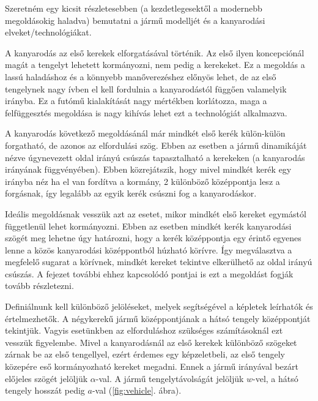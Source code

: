 
Szeretném egy kicsit részletesebben (a kezdetlegesektől a modernebb megoldásokig haladva) bemutatni a jármű modelljét és a kanyarodási elveket/technológiákat.

A kanyarodás az első kerekek elforgatásával történik. Az első ilyen koncepciónál magát a tengelyt lehetett kormányozni, nem pedig a kerekeket. Ez a megoldás a lassú haladáshoz és a könnyebb manőverezéshez előnyös lehet, de az első tengelynek nagy ívben el kell fordulnia a kanyarodástól függően valamelyik irányba. Ez a futómű kialakítását nagy mértékben korlátozza, maga a felfüggesztés megoldása is nagy kihívás lehet ezt a technológiát alkalmazva.

A kanyarodás következő megoldásánál már mindkét első kerék külön-külön forgatható, de azonos az elfordulási szög. Ebben az esetben a jármű dinamikáját nézve úgynevezett oldal irányú csúszás tapasztalható a kerekeken (a kanyarodás irányának függvényében). Ebben közrejátszik, hogy mivel mindkét kerék egy irányba néz ha el van fordítva a kormány, 2 különböző középpontja lesz a forgásnak, így legalább az egyik kerék csúszni fog a kanyarodáskor.

Ideális megoldásnak vesszük azt az esetet, mikor mindkét első kereket egymástól függetlenül lehet kormányozni. Ebben az esetben mindkét kerék kanyarodási szögét meg lehetne úgy határozni, hogy a kerék középpontja egy érintő egyenes lenne a közös kanyarodási középpontból húzható körívre. Így megválasztva a megfelelő sugarat a körívnek, mindkét kereket tekintve elkerülhető az oldal irányú csúszás. A fejezet további ehhez kapcsolódó pontjai is ezt a megoldást fogják tovább részletezni.

Definiálnunk kell különböző jelöléseket, melyek segítségével a képletek leírhatók és értelmezhetők. A négykerekű jármű középpontjának a hátsó tengely középpontját tekintjük. Vagyis esetünkben az elforduláshoz szükséges számításoknál ezt vesszük figyelembe. Mivel a kanyarodásnál az első kerekek különböző szögeket zárnak be az első tengellyel, ezért érdemes egy képzeletbeli, az első tengely közepére eső kormányozható kereket megadni. Ennek a jármű irányával bezárt előjeles szögét jelöljük $\alpha$-val. A jármű tengelytávolságát jelöljük $w$-vel, a hátsó tengely hosszát pedig $a$-val (\ref{fig:vehicle}. ábra).

